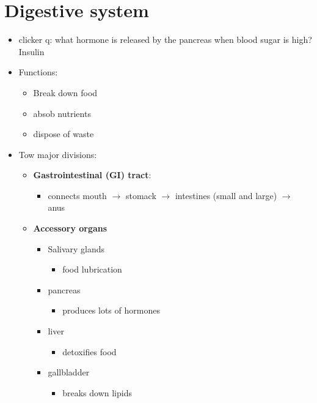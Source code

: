 \documentclass{article}
\theoremstyle{definition}
\begin{document}
\section{Digestive system}
\begin{itemize}
	\item clicker q: what hormone is released by the pancreas when blood sugar is high? Insulin
	\item Functions:
		\begin{itemize}
			\item Break down food
			\item absob nutrients
			\item dispose of waste
		\end{itemize}
	\item Tow major divisions:
		\begin{itemize}
			\item \textbf{Gastrointestinal (GI) tract}:
				\begin{itemize}
					\item connects mouth $\to$ stomack $\to$ intestines (small and large) $\to$ anus
				\end{itemize}
			\item \textbf{Accessory organs} 
				\begin{itemize}
					\item Salivary glands
						\begin{itemize}
							\item food lubrication
						\end{itemize}
					\item pancreas
						\begin{itemize}
							\item produces lots of hormones
						\end{itemize}
					\item liver
						\begin{itemize}
							\item detoxifies food
						\end{itemize}
					\item gallbladder
					\begin{itemize}
						\item breaks down lipids
					\end{itemize}
				\end{itemize}
		\end{itemize}
\end{itemize}
\end{document}
